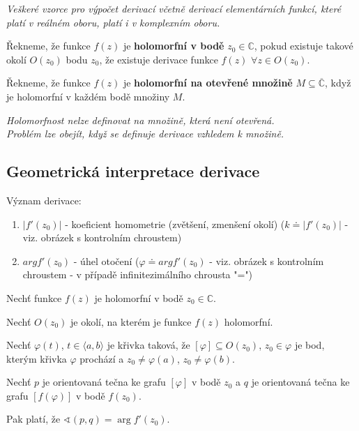 \textit{Veškeré vzorce pro výpočet derivací včetně derivací elementárních funkcí, které platí v reálném oboru, platí i v komplexním oboru.}

\begin{definition}
Řekneme, že funkce $f(z)$ je \textbf{holomorfní v bodě} $z_0\in\mathbb{C}$, pokud existuje takové okolí $O(z_0)$ bodu $z_0$, že existuje derivace funkce $f(z)$  $\forall z \in O(z_0)$.
\end{definition}

\begin{definition}
Řekneme,  že funkce $f(z)$ je \textbf{holomorfní na otevřené množině} $M\subseteq\mathbb{\overline{C}}$, když je holomorfní v každém bodě množiny $M$.
\end{definition}

\textit{Holomorfnost nelze definovat na množině, která není otevřená. \\ Problém lze obejít, když se definuje derivace vzhledem k množině.}

\subsection{Geometrická interpretace derivace}
Význam derivace:
\begin{enumerate}
\item $|f'(z_0)|$ - koeficient homometrie (zvětšení, zmenšení okolí) ($k \doteq |f'(z_0)|$ - viz. obrázek s kontrolním chroustem)
\item $arg f'(z_0)$ - úhel otočení ($\varphi \doteq arg f'(z_0)$ - viz. obrázek s kontrolním chroustem - v případě infinitezimálního chrousta "=")
\end{enumerate}
\begin{theorem}
    Nechť funkce $f(z)$ je holomorfní v bodě $z_0\in\mathbb{C}$. 
    
    Nechť $O(z_0)$ je okolí, na kterém je funkce $f(z)$ holomorfní. 
    
    Nechť $\varphi(t)$, $t\in\langle a,b\rangle$ je křivka taková, že $[\varphi]\subseteq O(z_0)$, $z_0\in\varphi$ je bod, kterým křivka $\varphi$ prochází a $z_0\neq\varphi(a)$, $z_0\neq\varphi(b)$.
    
    Nechť $p$ je orientovaná tečna ke grafu $[\varphi]$ v bodě $z_0$ a $q$ je orientovaná tečna ke grafu $[f(\varphi)]$ v bodě $f(z_0)$.
    
    Pak platí, že $\sphericalangle (p,q) = \arg f'(z_0)$.
\end{theorem}

